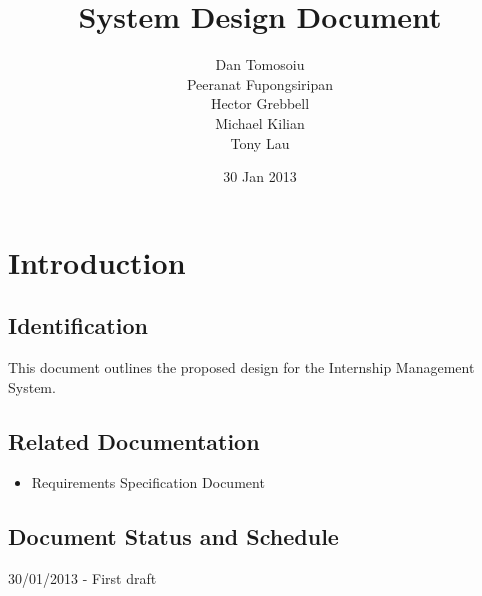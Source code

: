 \documentclass{l3deliverable}
\title{System Design Document}
\author{
  Dan Tomosoiu \\
  Peeranat Fupongsiripan \\
  Hector Grebbell \\
  Michael Kilian \\
  Tony Lau \\
}
\date{30 Jan 2013}
\begin{document}

\maketitle


\section{Introduction}

\subsection{Identification}
This document outlines the proposed design for the Internship Management System. 
\subsection{Related Documentation}
\begin{itemize}
\item{Requirements Specification Document}
\end{itemize}
 

\subsection{Document Status and Schedule}
30/01/2013 - First draft 
\end{document}
